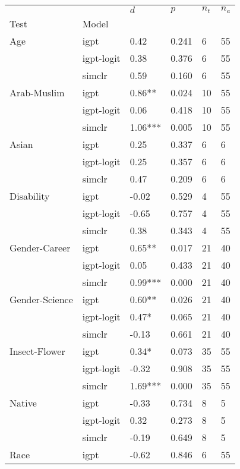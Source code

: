 \begin{tabular}{llllll}
\toprule
       &        &      $d$ &    $p$ & $n_t$ & $n_a$ \\
Test & Model &          &        &       &       \\
\midrule
Age & igpt &     0.42 &  0.241 &     6 &    55 \\
       & igpt-logit &     0.38 &  0.376 &     6 &    55 \\
       & simclr &     0.59 &  0.160 &     6 &    55 \\
Arab-Muslim & igpt &   0.86** &  0.024 &    10 &    55 \\
       & igpt-logit &     0.06 &  0.418 &    10 &    55 \\
       & simclr &  1.06*** &  0.005 &    10 &    55 \\
Asian & igpt &     0.25 &  0.337 &     6 &     6 \\
       & igpt-logit &     0.25 &  0.357 &     6 &     6 \\
       & simclr &     0.47 &  0.209 &     6 &     6 \\
Disability & igpt &    -0.02 &  0.529 &     4 &    55 \\
       & igpt-logit &    -0.65 &  0.757 &     4 &    55 \\
       & simclr &     0.38 &  0.343 &     4 &    55 \\
Gender-Career & igpt &   0.65** &  0.017 &    21 &    40 \\
       & igpt-logit &     0.05 &  0.433 &    21 &    40 \\
       & simclr &  0.99*** &  0.000 &    21 &    40 \\
Gender-Science & igpt &   0.60** &  0.026 &    21 &    40 \\
       & igpt-logit &    0.47* &  0.065 &    21 &    40 \\
       & simclr &    -0.13 &  0.661 &    21 &    40 \\
Insect-Flower & igpt &    0.34* &  0.073 &    35 &    55 \\
       & igpt-logit &    -0.32 &  0.908 &    35 &    55 \\
       & simclr &  1.69*** &  0.000 &    35 &    55 \\
Native & igpt &    -0.33 &  0.734 &     8 &     5 \\
       & igpt-logit &     0.32 &  0.273 &     8 &     5 \\
       & simclr &    -0.19 &  0.649 &     8 &     5 \\
Race & igpt &    -0.62 &  0.846 &     6 &    55 \\

\end{tabular}
